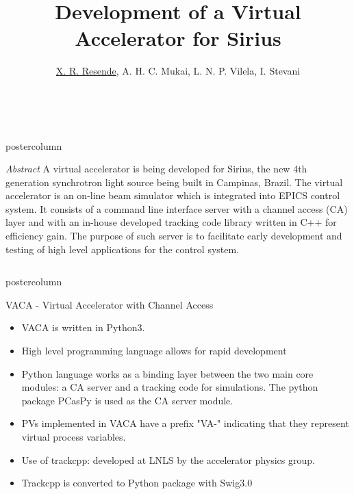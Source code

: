\documentclass[20pt]{beamer}
\title{\huge Development of a Virtual Accelerator for Sirius}
\author{\underline{X. R. Resende}, A. H. C. Mukai, L. N. P. Vilela, I. Stevani}
\institute{Brazilian Synchrotron Light Laboratory (LNLS), Campinas, Brazil}
\date{\monthname \ \the\year}
\newlength{\abstractheight}
\newlength{\columnheight}
\begin{document}
\begin{frame}
\begin{beamercolorbox}[center]{postercolumn}
	\begin{minipage}{\textwidth}
		\parbox[t][\abstractheight]{\textwidth}{
		\begin{myblock}{\textit{Abstract}}
		A virtual accelerator is being developed for Sirius, the new 4th generation synchrotron light source being built in Campinas, Brazil.
		The virtual accelerator is an on-line beam simulator which is integrated into EPICS control system.
		It consists of a command line interface server with a channel access (CA) layer and with an in-house developed tracking code library written in C++ for efficiency gain.
		The purpose of such server is to facilitate early development and testing of high level applications for the control system.
		\end{myblock}
	}\end{minipage}
\end{beamercolorbox}
\begin{columns}
	\begin{column}{0.45\textwidth}
		\begin{beamercolorbox}[center]{postercolumn}
			\begin{minipage}{.98\textwidth}  %
				\parbox[t][\columnheight]{\textwidth}{ %
					\begin{myblock}{VACA - Virtual Accelerator with Channel Access}
						\begin{itemize}
							\item VACA is written in Python3.
							\item High level programming language allows for rapid development
							\item Python language works as a binding layer between the two main core modules: a CA server and a tracking code for simulations.
							The python package PCasPy is used as the CA server module.
							\item PVs implemented in VACA have a prefix "VA-" indicating that they represent virtual process variables.
							\item Use of trackcpp: developed at LNLS by the accelerator physics group.
							\item Trackcpp is converted to Python package with Swig3.0
						\end{itemize}
						\begin{figure}

\end{figure}
\end{myblock}}
\end{minipage}
\end{beamercolorbox}
\end{column}
\end{columns}
\end{frame}
\end{document}
